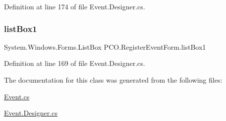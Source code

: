Definition at line 174 of file Event.\+Designer.\+cs.

\mbox{\label{classPCO_1_1RegisterEventForm_a4aa0fbf4f9a911ecb9bf49c3faeb8b6f}} 
\subsubsection{\texorpdfstring{list\+Box1}{listBox1}}
{\footnotesize\ttfamily System.\+Windows.\+Forms.\+List\+Box P\+C\+O.\+Register\+Event\+Form.\+list\+Box1\hspace{0.3cm}{\ttfamily [private]}}



Definition at line 169 of file Event.\+Designer.\+cs.



The documentation for this class was generated from the following files\+:\begin{DoxyCompactItemize}
\item 
\hyperlink{Event_8cs}{Event.\+cs}\item 
\hyperlink{Event_8Designer_8cs}{Event.\+Designer.\+cs}\end{DoxyCompactItemize}

